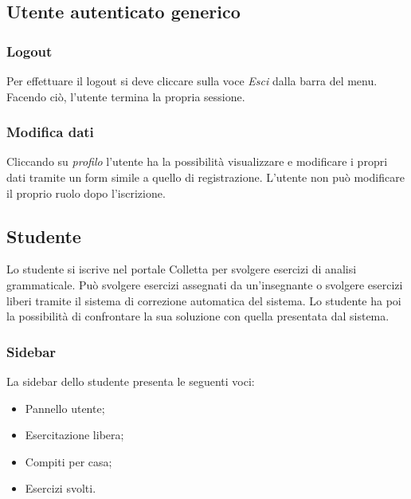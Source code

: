 \subsection{Utente autenticato generico}

    \subsubsection{Logout}
    Per effettuare il {logout} si deve cliccare sulla voce \textit{Esci} dalla barra del menu. Facendo ciò, l'utente termina la propria sessione.
    \subsubsection{Modifica dati}
    Cliccando su \textit{profilo} l'utente ha la possibilità visualizzare e modificare i propri dati tramite un form simile a quello di registrazione. L'utente non può modificare il proprio ruolo dopo l'iscrizione.

    \subsection{Studente}
      Lo studente si iscrive nel portale Colletta per svolgere esercizi di analisi grammaticale. Può svolgere esercizi assegnati da un'insegnante o svolgere esercizi liberi tramite il sistema di correzione automatica del sistema. Lo studente ha poi la possibilità di confrontare la sua soluzione con quella presentata dal sistema.
        \subsubsection{Sidebar}
          La sidebar dello studente presenta le seguenti voci:
            \begin{itemize}
                \item Pannello utente;
                \item Esercitazione libera;
                \item Compiti per casa;
                \item Esercizi svolti.
            \end{itemize}
            
            
            
            
            
            
